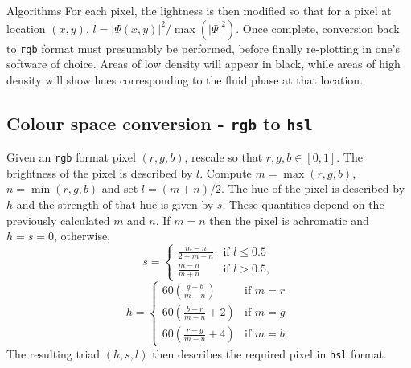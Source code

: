 \begin{chapter}{\label{app:algorithms}Algorithms}
For each pixel, the lightness is then modified so that for a pixel at location $(x,y)$, $l = |\Psi(x,y)|^2/\max(|\Psi|^2)$. Once complete, conversion back to {\tt rgb} format must presumably be performed, before finally re-plotting in one's software of choice. Areas of low density will appear in black, while areas of high density will show hues corresponding to the fluid phase at that location.

\subsection{Colour space conversion - {\tt rgb} to {\tt hsl}}
Given an {\tt rgb} format pixel $(r,g,b)$, rescale so that $r,g,b \in [0,1]$. The brightness of the pixel is described by $l$. Compute $m = \max(r,g,b)$, $n = \min(r,g,b)$ and set $l = (m+n)/2$. The hue of the pixel is described by $h$ and the strength of that hue is given by $s$. These quantities depend on the previously calculated $m$ and $n$. If $m=n$ then the pixel is achromatic and $h=s=0$, otherwise,
\begin{equation}
s =
    \begin{cases}
      \frac{m-n}{2 - m - n} &\mbox{if } l \leq 0.5 \\
      \frac{m-n}{m+n} &\mbox{if } l > 0.5,
    \end{cases}
\end{equation}
\begin{equation}
h =
    \begin{cases}
      60(\frac{g-b}{m-n}) &\mbox{if } m=r \\
      60(\frac{b-r}{m-n}+2) &\mbox{if } m=g \\
      60(\frac{r-g}{m-n}+4) &\mbox{if } m=b.
    \end{cases}
\end{equation}
The resulting triad $(h,s,l)$ then describes the required pixel in {\tt hsl} format.


\end{chapter}
